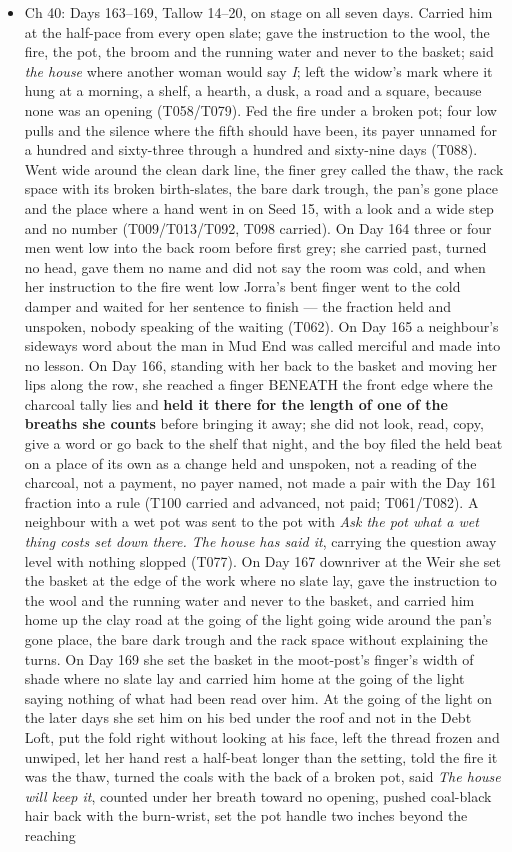 \documentclass{design/chronicle}
\begin{document}
{\begin{itemize}[leftmargin=1.4em,itemsep=1pt,topsep=3pt,parsep=0pt]
\item Ch 40: Days 163–169, Tallow 14–20, on stage on all seven days. Carried him at the half-pace from every open slate; gave the instruction to the wool, the fire, the pot, the broom and the running water and never to the basket; said \emph{the house} where another woman would say \emph{I}; left the widow’s mark where it hung at a morning, a shelf, a hearth, a dusk, a road and a square, because none was an opening (T058/T079). Fed the fire under a broken pot; four low pulls and the silence where the fifth should have been, its payer unnamed for a hundred and sixty-three through a hundred and sixty-nine days (T088). Went wide around the clean dark line, the finer grey called the thaw, the rack space with its broken birth-slates, the bare dark trough, the pan’s gone place and the place where a hand went in on Seed 15, with a look and a wide step and no number (T009/T013/T092, T098 carried). On Day 164 three or four men went low into the back room before first grey; she carried past, turned no head, gave them no name and did not say the room was cold, and when her instruction to the fire went low Jorra’s bent finger went to the cold damper and waited for her sentence to finish — the fraction held and unspoken, nobody speaking of the waiting (T062). On Day 165 a neighbour’s sideways word about the man in Mud End was called merciful and made into no lesson. On Day 166, standing with her back to the basket and moving her lips along the row, she reached a finger BENEATH the front edge where the charcoal tally lies and \textbf{held it there for the length of one of the breaths she counts} before bringing it away; she did not look, read, copy, give a word or go back to the shelf that night, and the boy filed the held beat on a place of its own as a change held and unspoken, not a reading of the charcoal, not a payment, no payer named, not made a pair with the Day 161 fraction into a rule (T100 carried and advanced, not paid; T061/T082). A neighbour with a wet pot was sent to the pot with \emph{Ask the pot what a wet thing costs set down there. The house has said it}, carrying the question away level with nothing slopped (T077). On Day 167 downriver at the Weir she set the basket at the edge of the work where no slate lay, gave the instruction to the wool and the running water and never to the basket, and carried him home up the clay road at the going of the light going wide around the pan’s gone place, the bare dark trough and the rack space without explaining the turns. On Day 169 she set the basket in the moot-post’s finger’s width of shade where no slate lay and carried him home at the going of the light saying nothing of what had been read over him. At the going of the light on the later days she set him on his bed under the roof and not in the Debt Loft, put the fold right without looking at his face, left the thread frozen and unwiped, let her hand rest a half-beat longer than the setting, told the fire it was the thaw, turned the coals with the back of a broken pot, said \emph{The house will keep it}, counted under her breath toward no opening, pushed coal-black hair back with the burn-wrist, set the pot handle two inches beyond the reaching 
\end{itemize}}
\end{document}
